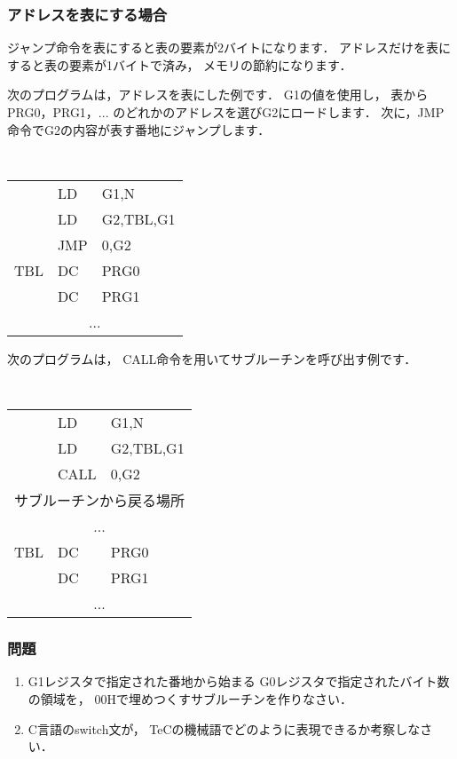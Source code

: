 \subsubsection{アドレスを表にする場合}

ジャンプ命令を表にすると表の要素が2バイトになります．
アドレスだけを表にすると表の要素が1バイトで済み，
メモリの節約になります．

次のプログラムは，アドレスを表にした例です．
G1の値を使用し，
表からPRG0，PRG1，... のどれかのアドレスを選びG2にロードします．
次に，JMP命令でG2の内容が表す番地にジャンプします．

\begin{center}
{\small\tt
\begin{tabular}{l l l}
    & LD    & G1,N      \\
    & LD    & G2,TBL,G1 \\
    & JMP   & 0,G2      \\
TBL & DC    & PRG0      \\
    & DC    & PRG1      \\
\multicolumn{3}{c}{...} \\
\end{tabular}
}
\end{center}

次のプログラムは，
CALL命令を用いてサブルーチンを呼び出す例です．

\begin{center}
{\small\tt
\begin{tabular}{l l l}
    & LD    & G1,N      \\
    & LD    & G2,TBL,G1 \\
    & CALL  & 0,G2      \\
\multicolumn{3}{c}{サブルーチンから戻る場所} \\
\multicolumn{3}{c}{...} \\
TBL & DC    & PRG0   \\
    & DC    & PRG1   \\
\multicolumn{3}{c}{...} \\
\end{tabular}
}
\end{center}

\subsubsection{問題}

\begin{enumerate}
\item G1レジスタで指定された番地から始まる
G0レジスタで指定されたバイト数の領域を，
00Hで埋めつくすサブルーチンを作りなさい．
\item C言語のswitch文が，
TeCの機械語でどのように表現できるか考察しなさい．
\end{enumerate}

